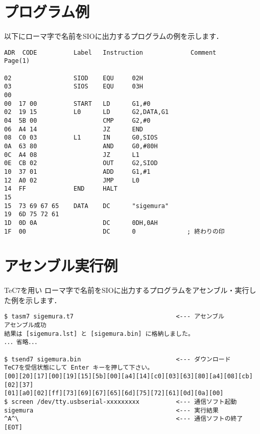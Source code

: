\newpage
\section{プログラム例}
以下にローマ字で名前をSIOに出力するプログラムの例を示します．

\begin{center}
\begin{verbatim}
ADR  CODE          Label   Instruction             Comment              Page(1)

02                 SIOD    EQU     02H            
03                 SIOS    EQU     03H            
00                 
00  17 00          START   LD      G1,#0          
02  19 15          L0      LD      G2,DATA,G1     
04  5B 00                  CMP     G2,#0          
06  A4 14                  JZ      END            
08  C0 03          L1      IN      G0,SIOS        
0A  63 80                  AND     G0,#80H        
0C  A4 08                  JZ      L1             
0E  CB 02                  OUT     G2,SIOD        
10  37 01                  ADD     G1,#1          
12  A0 02                  JMP     L0             
14  FF             END     HALT                   
15                 
15  73 69 67 65    DATA    DC      "sigemura"     
19  6D 75 72 61 
1D  0D 0A                  DC      0DH,0AH        
1F  00                     DC      0              ; 終わりの印
\end{verbatim}
\end{center}

\section{アセンブル実行例}
TeC7を用い
ローマ字で名前をSIOに出力するプログラムをアセンブル・実行した例を示します．

\begin{center}
\begin{verbatim}
$ tasm7 sigemura.t7                            <--- アセンブル
アセンブル成功
結果は [sigemura.lst] と [sigemura.bin] に格納しました。
．．．省略．．．

$ tsend7 sigemura.bin                          <--- ダウンロード
TeC7を受信状態にして Enter キーを押して下さい。
[00][20][17][00][19][15][5b][00][a4][14][c0][03][63][80][a4][08][cb][02][37]
[01][a0][02][ff][73][69][67][65][6d][75][72][61][0d][0a][00]
$ screen /dev/tty.usbserial-xxxxxxxxx          <--- 通信ソフト起動
sigemura                                       <--- 実行結果
^A^\                                           <--- 通信ソフトの終了
[EOT]
\end{verbatim}
\end{center}

